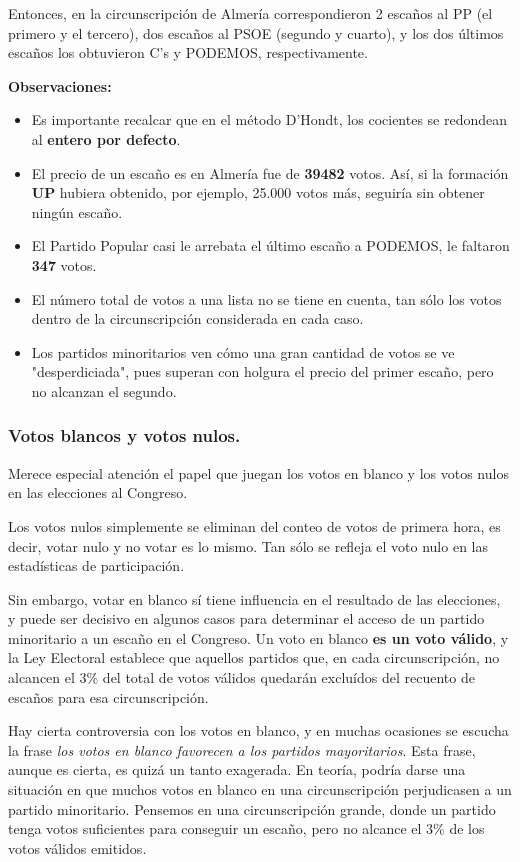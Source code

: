 \documentclass[11pt]{article}
\begin{document}
\vspace{1em}
  Entonces, en la circunscripción de Almería correspondieron 2 escaños al PP (el primero y el tercero), dos escaños al PSOE (segundo y cuarto), y los dos últimos escaños los obtuvieron C's y PODEMOS, respectivamente.
  
  \textbf{Observaciones:}
  
  \begin{itemize}
  \item Es importante recalcar que en el método D'Hondt, los cocientes se redondean al \textbf{entero por defecto}.
  \item El precio de un escaño es en Almería fue de \textbf{39482} votos. Así, si la formación \textbf{UP} hubiera obtenido, por ejemplo, 25.000 votos más, seguiría sin obtener ningún escaño.
  \item El Partido Popular casi le arrebata el último escaño a PODEMOS, le faltaron \textbf{347} votos.
  \item El número total de votos a una lista no se tiene en cuenta, tan sólo los votos dentro de la circunscripción considerada en cada caso.
  \item Los partidos minoritarios ven cómo una gran cantidad de votos se ve "desperdiciada", pues superan con holgura el precio del primer escaño, pero no alcanzan el segundo.
	\end{itemize}
	
	
	\subsubsection{Votos blancos y votos nulos.}
	
	Merece especial atención el papel que juegan los votos en blanco y los votos nulos en las elecciones al Congreso.
	
	Los votos nulos simplemente se eliminan del conteo de votos de primera hora, es decir, votar nulo y no votar es lo mismo. Tan sólo se refleja el voto nulo en las estadísticas de participación.
	
	Sin embargo, votar en blanco sí tiene influencia en el resultado de las elecciones, y puede ser decisivo en algunos casos para determinar el acceso de un partido minoritario a un escaño en el Congreso. Un voto en blanco \textbf{es un voto válido}, y la Ley Electoral establece que aquellos partidos que, en cada circunscripción, no alcancen el 3\% del total de votos válidos quedarán excluídos del recuento de escaños para esa circunscripción.
	
	Hay cierta controversia con los votos en blanco, y en muchas ocasiones se escucha la frase \textit{los votos en blanco favorecen a los partidos mayoritarios}. Esta frase, aunque es cierta, es quizá un tanto exagerada. En teoría, podría darse una situación en que muchos votos en blanco en una circunscripción perjudicasen a un partido minoritario. Pensemos en una circunscripción grande, donde un partido tenga votos suficientes para conseguir un escaño, pero no alcance el 3\% de los votos válidos emitidos.
	
\end{document}
